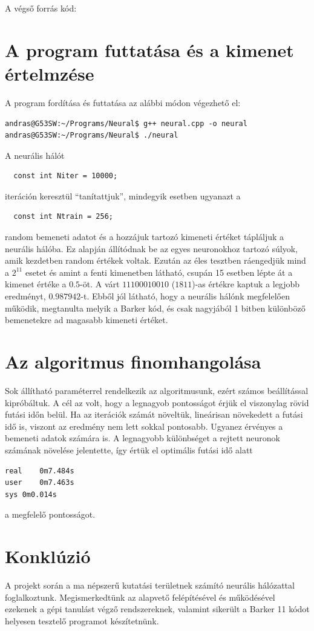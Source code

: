 \documentclass[a4paper]{article}
\begin{document}
A végső forrás kód:



\section{A program futtatása és a kimenet értelmzése}

A program fordítása és futtatása az alábbi módon végezhető el:

\lstset{language=Bash}
\begin{lstlisting}
andras@G53SW:~/Programs/Neural$ g++ neural.cpp -o neural
andras@G53SW:~/Programs/Neural$ ./neural
\end{lstlisting}



A neurális hálót

\lstset{language=C++}
\begin{lstlisting}
  const int Niter = 10000;
\end{lstlisting}
iteráción keresztül ``tanítattjuk'', mindegyik esetben ugyanazt a
\begin{lstlisting}
  const int Ntrain = 256;
\end{lstlisting}
random bemeneti adatot és a hozzájuk tartozó kimeneti értéket tápláljuk a neurális hálóba. Ez alapján állítódnak be az egyes neuronokhoz tartozó súlyok, amik kezdetben random értékek voltak. Ezután az éles tesztben ráengedjük mind a $2^{11}$ esetet és amint a fenti kimenetben látható, csupán 15 esetben lépte át a kimenet értéke a $0.5$-öt. A várt $11100010010$ ($1811$)-as értékre kaptuk a legjobb eredményt, $0.987942$-t. Ebből jól látható, hogy a neurális hálónk megfelelően működik, megtanulta melyik a Barker kód, és csak nagyjából 1 bitben különböző bemenetekre ad magasabb kimeneti értéket.

\section{Az algoritmus finomhangolása}
Sok állítható paraméterrel rendelkezik az algoritmusunk, ezért számos beállítással kipróbáltuk. A cél az volt, hogy a legnagyob pontosságot érjük el viszonylag rövid futási időn belül. Ha az iterációk számát növeltük, lineárisan növekedett a futási idő is, viszont az eredmény nem lett sokkal pontosabb. Ugyanez érvényes a bemeneti adatok számára is. A legnagyobb különbséget a rejtett neuronok számának növelése jelentette, így értük el optimális futási idő alatt

\lstset{language=Bash}
\begin{lstlisting}
real	0m7.484s
user	0m7.463s
sys	0m0.014s
\end{lstlisting}

a megfelelő pontosságot.

\section{Konklúzió}
A projekt során a ma népszerű kutatási területnek számító neurális hálózattal foglalkoztunk. Megismerkedtünk az alapvető felépítésével és működésével ezekenek a gépi tanulást végző rendszereknek, valamint sikerült a Barker 11 kódot helyesen tesztelő programot készítetnünk.  
\end{document}
